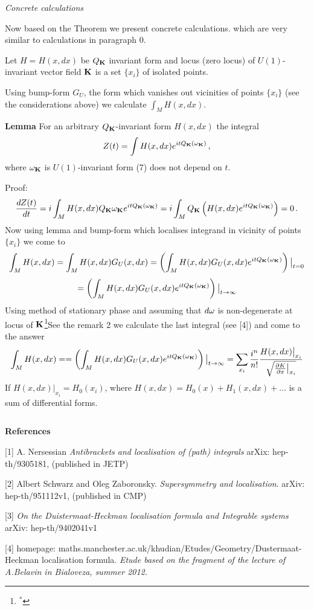\m

{\it Concrete calculations}

   Now based on the Theorem we present concrete calculations.
which are very similar to calculations in paragraph $0$.

Let $H=H(x,dx)$ be $Q_{\bf K}$ invariant form and 
locus (zero locus)
of $U(1)$-invariant 
vector field ${\bf K}$ is a set $\{x_i\}$ of isolated points.

Using bump-form $G_U$, the form which vanishes out vicinities of
points $\{x_i\}$ (see the considerations above) we calculate
$\int_M H(x,dx)$.


 {\bf Lemma}  For an arbitrary $Q_{\bf K}$-invariant form $H(x,dx)$ the integral
            $$
   Z(t)=\int H(x,dx)e^{itQ_{\bf K}({\omega}_{\bf K})}\,, 
            $$
where ${\omega}_{\bf K}$ is $U(1)$-invariant form 
(7) does not depend on $t$.

  Proof:
              $$
 {dZ(t)\over dt}=
           i\int_M 
  H(x,dx)Q_{\bf K}
   {\omega}_{\bf K}
  e^{itQ_{\bf K}({\omega}_{\bf K})}=
    i\int_M Q_{\bf K}
          \left(
  H(x,dx)e^{itQ_{\bf K}({\omega}_{\bf K})}
          \right)=0\,.
              $$
Now using lemma and bump-form which localises integrand in vicinity of
points $\{x_i\}$ we come to 
           $$
\int_M H(x,dx)=\int_M H(x,dx)G_U(x,dx)=
\left(
\int_M H(x,dx)G_U(x,dx)e^{itQ_{\bf K}({\omega}_{\bf K})}\right)
\big\vert_{t=0}
             $$
             $$
              =
\left(\int_M H(x,dx)G_U(x,dx)e^{itQ_{\bf K}({\omega}_{\bf K})}\right)
\big\vert_{t\to\infty}
           $$ 
Using method of stationary phase and assuming that $d{\omega}$ is non-degenerate
at locus of ${\bf K}$\footnote{$^*$}{See the remark 2}  we 
calculate the last integral
(see [4]) and come to the answer
           $$
\int_M H(x,dx)=
              =
\left(\int_M H(x,dx)G_U(x,dx)e^{itQ_{\bf K}({\omega}_{\bf K})}\right)
\big\vert_{t\to\infty}=
\sum_{x_i}{i^n\over n!}{H(x,dx)\big\vert_{x_i}\over 
  \sqrt  {{\partial K\over \partial x}\big\vert_{x_i}} }
           $$ 
If $H(x,dx)\big\vert_{x_i}=H_0(x_i)$, where
$H(x,dx)=H_0(x)+H_1(x,dx)+\dots$ is a sum of differential forms. 
 

$$ $$

\centerline {\bf References}

 [1]  A. Nersessian {\it Antibrackets and localisation of (path) integrals
                    }
   arXix: hep-th/9305181, (published in JETP)
\m

 [2] Albert Schwarz and Oleg Zaboronsky. 
 {\it Supersymmetry and localisation}. arXiv: hep-th/951112v1,
  (published in CMP)


 \m


        
 [3] {\it On the Duistermaat-Heckman localisation 
 formula and Integrable systems} 
arXiv: hep-th/9402041v1

\m


 [4] homepage: maths.manchester.ac.uk/khudian/Etudes/Geometry/Dustermaat-Heckman  localisation formula. 
{\it Etude based on the fragment of the lecture of 
A.Belavin in Bialoveza, summer 2012.} 

\bye
